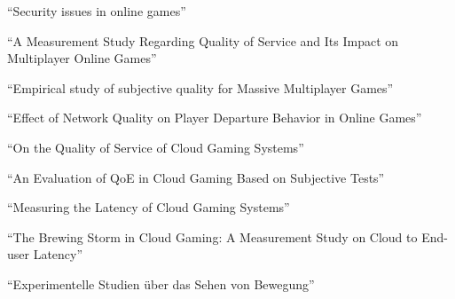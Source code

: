 ``Security issues in online games'' \cite{doi:10.1108/02640470210424455}

``A Measurement Study Regarding Quality of Service and Its Impact on Multiplayer Online Games'' \cite{Bredel:2010:MSR:1944796.1944797}

``Empirical study of subjective quality for Massive Multiplayer Games'' \cite{4604397}

``Effect of Network Quality on Player Departure Behavior in Online Games'' \cite{4591393}

``On the Quality of Service of Cloud Gaming Systems'' \cite{6670099}

``An Evaluation of {QoE} in Cloud Gaming Based on Subjective Tests'' \cite{5976180}

``Measuring the Latency of Cloud Gaming Systems'' \cite{Chen:2011:MLC:2072298.2071991}

``The Brewing Storm in Cloud Gaming: A Measurement Study on Cloud to End-user Latency'' \cite{Choy:2012:BSC:2501560.2501563}

``Experimentelle Studien über das Sehen von Bewegung'' \cite{wertheimer1912experimentelle}









